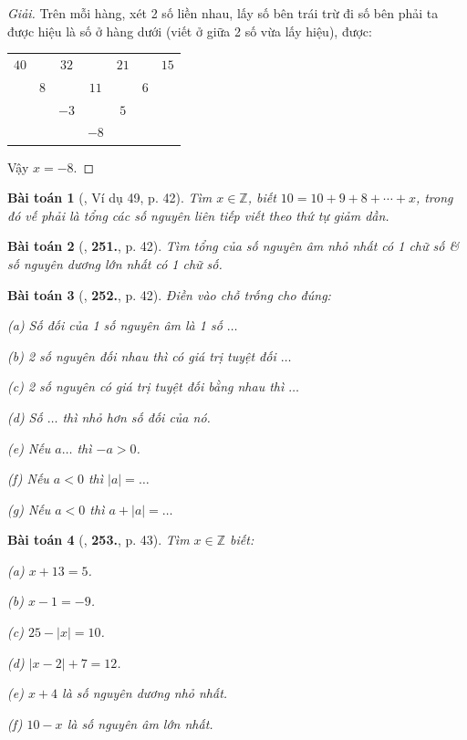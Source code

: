 \documentclass{article}
\numberwithin{equation}{section}
\newtheorem{baitoan}{Bài toán}
\begin{document}
\begin{proof}[Giải]
	Trên mỗi hàng, xét 2 số liền nhau, lấy số bên trái trừ đi số bên phải ta được hiệu là số ở hàng dưới (viết ở giữa 2 số vừa lấy hiệu), được:
	\begin{table}[H]
		\centering
		\begin{tabular}{ccccccc}
			$40$ &  & $32$ &  & $21$ &  &  $15$ \\
			& $8$ &  & $11$ &  & $6$ &  \\
			&  & $-3$ &  & $5$ &  &  \\
			&  &  & $-8$ &  &  &  \\
		\end{tabular}
	\end{table}
	Vậy $x = -8$.
\end{proof}

\begin{baitoan}[\cite{Binh_Toan_6_tap_1}, Ví dụ 49, p. 42]
	Tìm $x\in\mathbb{Z}$, biết $10 = 10 + 9 + 8 + \cdots + x$, trong đó vế phải là tổng các số nguyên liên tiếp viết theo thứ tự giảm dần.
\end{baitoan}

\begin{baitoan}[\cite{Binh_Toan_6_tap_1}, \textbf{251.}, p. 42]
	Tìm tổng của số nguyên âm nhỏ nhất có 1 chữ số \& số nguyên dương lớn nhất có 1 chữ số.
\end{baitoan}

\begin{baitoan}[\cite{Binh_Toan_6_tap_1}, \textbf{252.}, p. 42]
	Điền vào chỗ trống cho đúng:
	\begin{enumerate*}
		\item[(a)] Số đối của 1 số nguyên âm là 1 số $\ldots$
		\item[(b)] 2 số nguyên đối nhau thì có giá trị tuyệt đối $\ldots$
		\item[(c)] 2 số nguyên có giá trị tuyệt đối bằng nhau thì $\ldots$
		\item[(d)] Số $\ldots$ thì nhỏ hơn số đối của nó.
		\item[(e)] Nếu $a\ldots$ thì $-a > 0$.
		\item[(f)] Nếu $a < 0$ thì $|a| = \ldots$
		\item[(g)] Nếu $a < 0$ thì $a + |a| = \ldots$
	\end{enumerate*}
\end{baitoan}

\begin{baitoan}[\cite{Binh_Toan_6_tap_1}, \textbf{253.}, p. 43]
	Tìm $x\in\mathbb{Z}$ biết:
	\begin{enumerate*}
		\item[(a)] $x + 13 = 5$.
		\item[(b)] $x - 1 = -9$.
		\item[(c)] $25 - |x| = 10$.
		\item[(d)] $|x - 2| + 7 = 12$.
		\item[(e)] $x + 4$ là số nguyên dương nhỏ nhất.
		\item[(f)] $10 - x$ là số nguyên âm lớn nhất.
	\end{enumerate*}
\end{baitoan}
\end{document}

